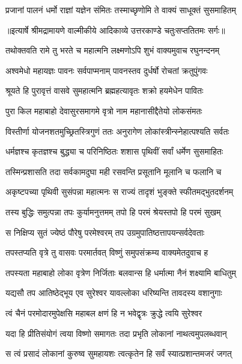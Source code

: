 \twolineshloka
{प्रजानां पालनं धर्मो राज्ञां यज्ञेन संमितः}
{तस्माच्छृणोमि ते वाक्यं साधूक्तं सुसमाहितम्} %


{॥इत्यार्षे श्रीमद्रामायणे वाल्मीकीये आदिकाव्ये उत्तरकाण्डे चतुःसप्ततितमः सर्गः॥}


\twolineshloka
{तथोक्तवति रामे तु भरते च महात्मनि}
{लक्ष्मणोऽपि शुभं वाक्यमुवाच रघुनन्दनम्} %

\twolineshloka
{अश्वमेधो महायज्ञः पावनः सर्वपाप्मनाम्}
{पावनस्तव दुर्धर्षो रोचतां क्रतुपुंगवः} %

\twolineshloka
{श्रूयते हि पुरावृत्तं वासवे सुमहात्मनि}
{ब्रह्महत्यावृतः शक्रो हयमेधेन पावितः} %

\twolineshloka
{पुरा किल महाबाहो देवासुरसमागमे}
{वृत्रो नाम महानासीद्दैतेयो लोकसंमतः} %

\twolineshloka
{विस्तीर्णा योजनशतमुच्छ्रितस्त्रिगुणं ततः}
{अनुरागेण लोकांस्त्रीन्स्नेहात्पश्यति सर्वतः} %

\twolineshloka
{धर्मज्ञश्च कृतज्ञश्च बुद्ध्या च परिनिष्ठितः}
{शशास पृथिवीं सर्वां धर्मेण सुसमाहितः} %

\twolineshloka
{तस्मिन्प्रशासति तदा सर्वकामदुघा मही}
{रसवन्ति प्रसूतानि मूलानि च फलानि च} %

\twolineshloka
{अकृष्टपच्या पृथिवी सुसंपन्ना महात्मनः}
{स राज्यं तादृशं भुङ्क्ते स्फीतमद्भुतदर्शनम्} %

\twolineshloka
{तस्य बुद्धिः समुत्पन्ना तपः कुर्यामनुत्तमम्}
{तपो हि परमं श्रेयस्तपो हि परमं सुखम्} %

\twolineshloka
{स निक्षिप्य सुतं ज्येष्ठं पौरेषु परमेश्वरम्}
{तप उग्रमुपातिष्ठत्तापयन्सर्वदेवताः} %

\twolineshloka
{तपस्तप्यति वृत्रे तु वासवः परमार्तवत्}
{विष्णुं समुपसंक्रम्य वाक्यमेतदुवाच ह} %

\twolineshloka
{तपस्यता महाबाहो लोका वृत्रेण निर्जिताः}
{बलवान्स हि धर्मात्मा नैनं शक्ष्यामि बाधितुम्} %

\twolineshloka
{यद्यसौ तप आतिष्ठेद्भूय एव सुरेश्वर}
{यावल्लोका धरिष्यन्ति तावदस्य वशानुगाः} %

\twolineshloka
{त्वं चैनं परमोदारमुपेक्षसि महाबल}
{क्षणं हि न भवेद्वृत्रः क्रुद्धे त्वयि सुरेश्वर} %

\twolineshloka
{यदा हि प्रीतिसंयोगं त्वया विष्णो समागतः}
{तदा प्रभृति लोकानां नाथत्वमुपलब्धवान्} %

\twolineshloka
{स त्वं प्रसादं लोकानां कुरुष्व सुमहायशः}
{त्वत्कृतेन हि सर्वं स्यात्प्रशान्तमजरं जगत्} %

